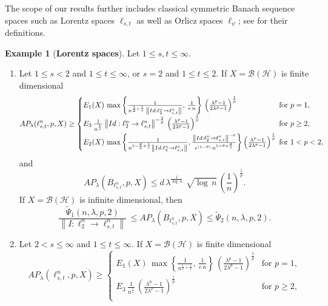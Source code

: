 \documentclass[a4paper,11pt, reqno]{amsart}
\theoremstyle{definition}
\newtheorem{example}{Example}[section]
\newcommand{\norm}[1]{\left\lVert#1\right\rVert}
\begin{document}
	The scope of our results further includes classical symmetric Banach sequence spaces such as Lorentz spaces $\ell_{s,t}$ as well as Orlicz spaces $\ell_{\psi}$; see \cite{Lindenstrauss-book} for their definitions. 
	\begin{example}[{\bf Lorentz spaces}]
		Let $1 \leq s,t \leq \infty$.
		\begin{enumerate}
			\item Let $1 \leq s <2$ and $1\leq t \leq \infty$, or $s=2$ and $1 \leq t \leq 2$. If $X=\mathcal{B}(\mathcal{H})$ is finite dimensional 
			\begin{equation*}
				 AP_{\lambda}(\ell^n_{s,t}, p,X) \geq	\begin{cases}
					E_{1}(X)\,  \max \left\{\frac{1}{n^{\frac{1}{2}+\frac{1}{s}}\, \norm{Id: \ell^n_{2} \rightarrow \ell^n_{s,t}}}, \, \frac{1}{e\,n}\right\}\, \left(\frac{\lambda^p -1}{2\lambda^p - 1}\right)^{\frac{1}{p}} & \text{for $p=1$}, \\[2mm]
					E_{3}\, \frac{1}{n^{\frac{1}{s}}}\norm{Id:\ell^n _2 \rightarrow \ell^n_{s,t}}^{-\frac{2}{p}}\, \left(\frac{\lambda^p -1}{2\lambda^p - 1}\right)^{\frac{1}{p}}\, & \text{for $p \geq 2$}, \\[2mm]
					
					E_{2}(X)\,  \max \left\{\frac{1}{n^{1-\frac{\theta}{2}+\frac{1}{s}} \norm{Id: \ell^n_{2} \rightarrow \ell^n_{s,t}}},  \frac{\norm{Id:\ell^n _2 \rightarrow \ell^n_{s,t}}^{-\theta}}{e^{(1-\theta)}\,n^{1-\theta+\frac{\theta}{s}}}\right\}\left(\frac{\lambda^p -1}{2\lambda^p - 1}\right)^{\frac{1}{p}} \hspace{-2mm} & \text{for $1<p< 2$}, 
				\end{cases}
			\end{equation*}
			and 
			$$AP_{\lambda}(B_{\ell^n_{s,t}}, p,X) \leq d\,  \lambda^{\frac{1}{\log\,n}}\,\, \sqrt{\log \, n} \, \left(\frac{1}{n}\right)^{\frac{1}{p}}.
			$$
			If $X=\mathcal{B}(\mathcal{H})$ is infinite dimensional, then
			$$\frac{\tilde{\Psi}_{1}(n,\lambda,p,2)}{\norm{I:\ell^n _2 \rightarrow \ell^n_{s,t}}} \, \leq AP_{\lambda}(B_{\ell^n_{s,t}}, p,X)  \leq  \tilde{\Psi}_{2}(n,\lambda,p,2).
			$$
			\item Let $2<s \leq \infty$ and $1 \leq t \leq \infty$. If $X=\mathcal{B}(\mathcal{H})$ is finite dimensional
			\begin{equation*} 
			AP_{\lambda}(\ell^n_{s,t}, p,X) \geq	\begin{cases}
				E_{1}(X)\,  \max \left\{\frac{1}{n^{\frac{1}{2}+\frac{1}{s}}}, \, \frac{1}{e\,n}\right\}\, \left(\frac{\lambda^p -1}{2\lambda^p - 1}\right)^{\frac{1}{p}} & \text{for $p=1$}, \\[2mm]
				E_{3}\, \frac{1}{n^{\frac{1}{s}}}\, \left(\frac{\lambda^p -1}{2\lambda^p - 1}\right)^{\frac{1}{p}}\, & \text{for $p \geq 2$}, \\[2mm]
				

\end{cases}
\end{equation*}
\end{enumerate}
\end{example}
\end{document}
